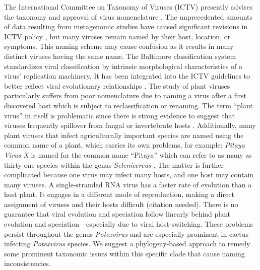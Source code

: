 \documentclass[11pt,letterpaper,titlepage]{article}
\begin{document}
\begin{linenumbers}
The International Committee on Taxonomy of Viruses (ICTV) presently advises the taxonomy and approval of virus nomenclature \citep{simmonds2017virus,lefkowitz2018virus,international2020new}.
The unprecedented amounts of data resulting from metagenomic studies have caused significant revisions in ICTV policy \citep{international2020new,simmonds2017virus}, but many viruses remain named by their host, location, or symptoms.
This naming scheme may cause confusion as it results in many distinct viruses having the same name.
The Baltimore classification system standardizes viral classification by intrinsic morphological characteristics of a virus' replication machinery. 
It has been integrated into the ICTV guidelines to better reflect viral evolutionary relationships \citep{international2020new}.
The study of plant viruses particularly suffers from poor nomenclature due to naming a virus after a first discovered host which is subject to reclassification or renaming. %
The term ``plant virus'' in itself is problematic since there is strong evidence to suggest that viruses frequently spillover from fungal or invertebrate hosts \citep{lefeuvre_evolution_2019}.
Additionally, many plant viruses that infect agriculturally important species are named using the common name of a plant, which carries its own problems, for example: \textit{Pitaya Virus X} is named for the common name ``Pitaya'' which can refer to as many as thirty-one species within the genus \textit{Selenicereus} \citep{korotkova_phylogenetic_2017,guerrero_phylogenetic_2019,le_bellec_12_2011}. %
The matter is further complicated because one virus may infect many hosts, and one host may contain many viruses. 
A single-stranded RNA virus has a faster rate of evolution than a host plant.
It engages in a different mode of reproduction, making a direct assignment of viruses and their hosts difficult (citation needed).%
There is no guarantee that viral evolution and speciation follow linearly behind plant evolution and speciation---especially due to viral host-switching.
These problems persist throughout the genus \textit{Potexvirus} and are especially prominent in cactus-infecting \textit{Potexvirus} species.
We suggest a phylogeny-based approach to remedy some prominent taxonomic issues within this specific clade that cause naming inconsistencies.



\end{linenumbers}
\end{document}
